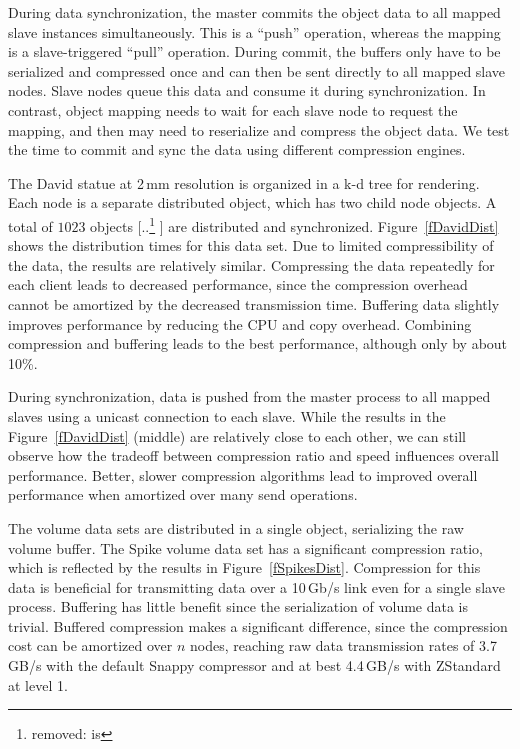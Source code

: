 \documentclass[10pt,journal,compsoc]{IEEEtran}
\newcommand{\fig}[1]{Figure~\ref{#1}}
\providecommand{\DIFaddtex}[1]{{\protect\color{blue} \sf #1}} %
\providecommand{\DIFdeltex}[1]{{\protect\color{red} [..\footnote{removed: #1} ]}} %
\providecommand{\DIFaddbegin}{} %
\providecommand{\DIFaddend}{} %
\providecommand{\DIFdelbegin}{} %
\providecommand{\DIFdelend}{} %
\providecommand{\DIFadd}[1]{\texorpdfstring{\DIFaddtex{#1}}{#1}} %
\providecommand{\DIFdel}[1]{\texorpdfstring{\DIFdeltex{#1}}{}} %
\newcommand{\DIFscaledelfig}{0.5}
\newlength{\DIFdelgraphicswidth} %
\newlength{\DIFdelgraphicsheight} %
\newcommand{\DIFaddincludegraphics}[2][]{{\color{blue}\fbox{\DIFOincludegraphics[#1]{#2}}}} %
\newcommand{\DIFdelincludegraphics}[2][]{%
\sbox{\DIFdelgraphicsbox}{\DIFOincludegraphics[#1]{#2}}%
\settoboxwidth{\DIFdelgraphicswidth}{\DIFdelgraphicsbox} %
\settoboxtotalheight{\DIFdelgraphicsheight}{\DIFdelgraphicsbox} %
\scalebox{\DIFscaledelfig}{%
\parbox[b]{\DIFdelgraphicswidth}{\usebox{\DIFdelgraphicsbox}\\[-\baselineskip] \rule{\DIFdelgraphicswidth}{0em}}\llap{\resizebox{\DIFdelgraphicswidth}{\DIFdelgraphicsheight}{%
\setlength{\unitlength}{\DIFdelgraphicswidth}%
\begin{picture}(1,1)%
\thicklines\linethickness{2pt} %
{\color[rgb]{1,0,0}\put(0,0){\framebox(1,1){}}}%
{\color[rgb]{1,0,0}\put(0,0){\line( 1,1){1}}}%
{\color[rgb]{1,0,0}\put(0,1){\line(1,-1){1}}}%
\end{picture}%
}\hspace*{3pt}}} %
} %
\DeclareRobustCommand{\DIFaddbegin}{\DIFOaddbegin \let\includegraphics\DIFaddincludegraphics} %
\DeclareRobustCommand{\DIFaddend}{\DIFOaddend \let\includegraphics\DIFOincludegraphics} %
\DeclareRobustCommand{\DIFdelbegin}{\DIFOdelbegin \let\includegraphics\DIFdelincludegraphics} %
\DeclareRobustCommand{\DIFdelend}{\DIFOaddend \let\includegraphics\DIFOincludegraphics} %
\begin{document}
During data synchronization, the master commits the object data to all mapped
slave instances simultaneously. This is a ``push'' operation, whereas the
mapping is a slave-triggered ``pull'' operation. \DIFaddbegin \DIFadd{During commit, the buffers
only have to be serialized and compressed once and can then be sent directly
to all mapped slave nodes. }\DIFaddend Slave nodes queue this data and consume it during
synchronization. \DIFaddbegin \DIFadd{In contrast, object mapping needs to wait for each slave node
to request the mapping, and then may need to reserialize and compress the
object data. }\DIFaddend We test the time to commit and sync the data using different
compression engines.

The David statue at 2\,mm resolution is organized in a k-d tree for rendering. Each
node is a separate distributed object, which has two child node objects. A
total of $1023$ objects \DIFdelbegin \DIFdel{is }\DIFdelend \DIFaddbegin \DIFadd{are }\DIFaddend distributed and synchronized. \fig{fDavidDist} shows
the distribution times for this data set. Due to limited compressibility of the
data, the results are relatively similar. Compressing the data repeatedly for
each client leads to decreased performance, since the compression overhead
cannot be amortized by the decreased transmission time. Buffering data slightly
improves performance by reducing the CPU and copy overhead. Combining
compression and buffering leads to the best performance, although only by about
10\%.

During synchronization, data is pushed from the master process to all mapped
slaves using a unicast connection to each slave. While the results in the
\fig{fDavidDist} (middle) are relatively close to each other, we can still
observe how the tradeoff between compression ratio and speed influences overall
performance. Better, slower compression algorithms lead to improved overall
performance when amortized over many send operations.

The volume data sets are distributed in a single object, serializing the raw
volume buffer. The Spike volume data set has a significant compression ratio,
which is reflected by the results in \fig{fSpikesDist}. Compression for this
data is beneficial for transmitting data over a 10\,Gb/s link even for a single
slave process. Buffering has little benefit since the serialization of volume
data is trivial. Buffered compression makes a significant difference, since the
compression cost can be amortized over $n$ nodes, reaching raw data transmission
rates of 3.7\,GB/s with the default Snappy compressor and at best 4.4\,GB/s with
ZStandard at level 1.
\end{document}
